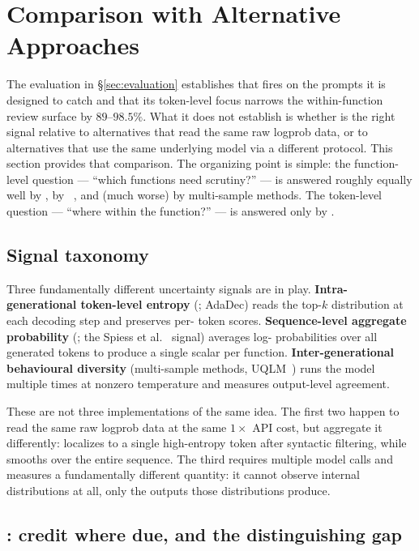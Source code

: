 \section{Comparison with Alternative Approaches}
\label{sec:comparison}

The evaluation in \S\ref{sec:evaluation} establishes that \eps fires
on the prompts it is designed to catch and that its token-level
focus narrows the within-function review surface by $89$--$98.5\%$.
What it does not establish is whether \eps is the right signal
relative to alternatives that read the same raw logprob data, or to
alternatives that use the same underlying model via a different
protocol. This section provides that comparison. The organizing
point is simple: the function-level question --- ``which functions
need scrutiny?'' --- is answered roughly equally well by \eps, by
\papg~\cite{spiess2025calibration}, and (much worse) by multi-sample
methods. The token-level question --- ``where within the function?''
--- is answered only by \eps.

\subsection{Signal taxonomy}
\label{subsec:signal-taxonomy}

Three fundamentally different uncertainty signals are in play.
\textbf{Intra-generational token-level entropy} (\eps; AdaDec) reads
the top-$k$ distribution at each decoding step and preserves per-%
token scores. \textbf{Sequence-level aggregate probability} (\papg;
the Spiess et al.~\cite{spiess2025calibration} signal) averages log-%
probabilities over all generated tokens to produce a single scalar
per function. \textbf{Inter-generational behavioural diversity}
(multi-sample methods, UQLM~\cite{uqlm2024}) runs the model multiple
times at nonzero temperature and measures output-level agreement.

These are not three implementations of the same idea. The first two
happen to read the same raw logprob data at the same $1\times$ API
cost, but aggregate it differently: \eps localizes to a single
high-entropy token after syntactic filtering, while \papg smooths
over the entire sequence. The third requires multiple model calls
and measures a fundamentally different quantity: it cannot observe
internal distributions at all, only the outputs those distributions
produce.

\subsection{\papg: credit where due, and the distinguishing gap}
\label{subsec:papg-comp}

